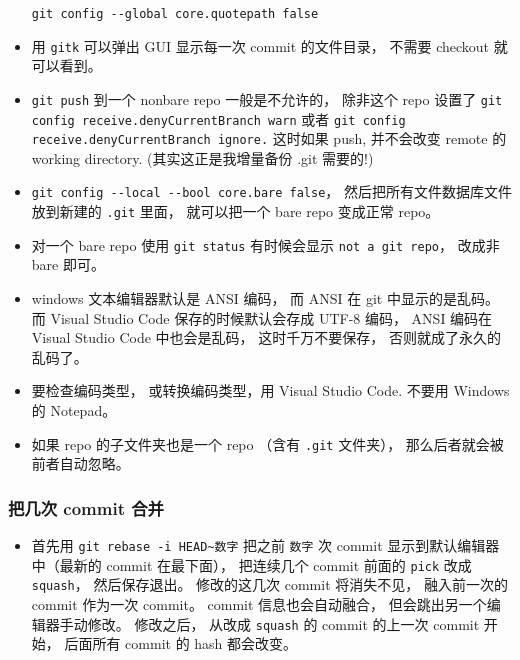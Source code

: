\begin{itemize}
\verb|git config --global core.quotepath false|
\item 用 \verb|gitk| 可以弹出 GUI 显示每一次 commit 的文件目录， 不需要 checkout 就可以看到。
\item \verb|git push| 到一个 nonbare repo 一般是不允许的， 除非这个 repo 设置了 \verb|git config receive.denyCurrentBranch warn| 或者 \verb|git config receive.denyCurrentBranch ignore.| 这时如果 push, 并不会改变 remote 的 working directory. (其实这正是我增量备份 .git 需要的!)
\item \verb|git config --local --bool core.bare false|， 然后把所有文件数据库文件放到新建的 \verb|.git| 里面， 就可以把一个 bare repo 变成正常 repo。
\item 对一个 bare repo 使用 \verb|git status| 有时候会显示 \verb|not a git repo|， 改成非 bare 即可。
\item windows 文本编辑器默认是 ANSI 编码， 而 ANSI 在 git 中显示的是乱码。 而 Visual Studio Code 保存的时候默认会存成 UTF-8 编码， ANSI 编码在 Visual Studio Code 中也会是乱码， 这时千万不要保存， 否则就成了永久的乱码了。
\item 要检查编码类型， 或转换编码类型，用 Visual Studio Code.  不要用 Windows 的 Notepad。
\item 如果 repo 的子文件夹也是一个 repo （含有 \verb|.git| 文件夹）， 那么后者就会被前者自动忽略。
\end{itemize}

\subsubsection{把几次 commit 合并}
\begin{itemize}
\item 首先用 \verb|git rebase -i HEAD~数字| 把之前 \verb|数字| 次 commit 显示到默认编辑器中（最新的 commit 在最下面）， 把连续几个 commit 前面的 \verb|pick| 改成 \verb|squash|， 然后保存退出。 修改的这几次 commit 将消失不见， 融入前一次的 commit 作为一次 commit。 commit 信息也会自动融合， 但会跳出另一个编辑器手动修改。 修改之后， 从改成 \verb|squash| 的 commit 的上一次 commit 开始， 后面所有 commit 的 hash 都会改变。
\end{itemize}


